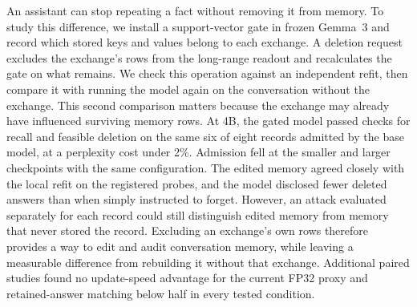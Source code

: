 An assistant can stop repeating a fact without removing it from memory.
To study this difference, we install a support-vector gate in frozen
Gemma~3 and record which stored keys and values belong to each exchange.
A deletion request excludes the exchange's rows from the long-range readout
and recalculates the gate on what remains. We check this operation against
an independent refit, then compare it with running the model again on the
conversation without the exchange. This second comparison matters because
the exchange may already have influenced surviving memory rows.
At 4B, the gated model passed checks for recall and feasible deletion on the
same six of eight records admitted by the base model, at a perplexity cost
under 2\%. Admission fell at the smaller and larger
checkpoints with the same configuration. The edited memory agreed closely
with the local refit on the registered probes, and the model disclosed fewer
deleted answers than when simply instructed to forget. However, an attack
evaluated separately for each record could still distinguish edited memory
from memory that never stored the record. Excluding an exchange's own rows
therefore provides a way to edit and audit conversation memory, while leaving
a measurable difference from rebuilding it without that exchange.
Additional paired studies found no update-speed advantage for the current
FP32 proxy and retained-answer matching below half in every tested condition.

